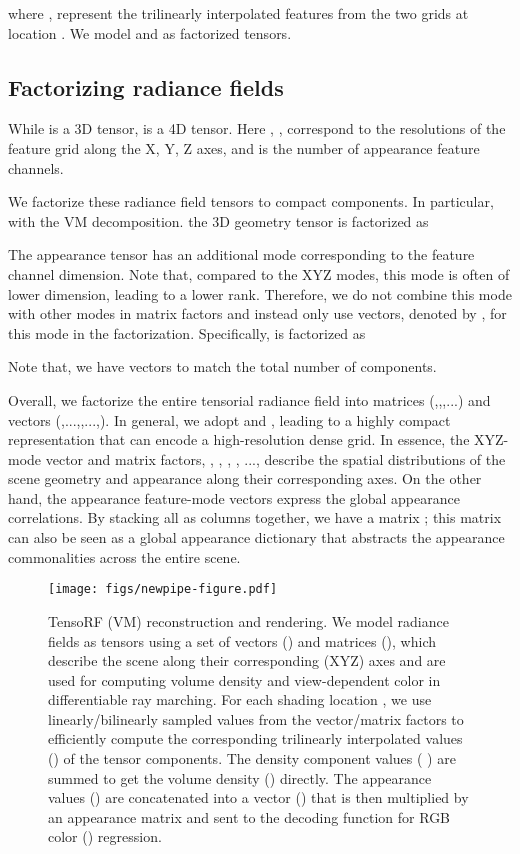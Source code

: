 \documentclass[runningheads]{llncs}
\begin{document}
where ,  represent the trilinearly interpolated features from the two grids at location . 
We model  and  as factorized tensors.






\subsection{Factorizing radiance fields}
While  is a 3D tensor,  is a 4D tensor. Here , ,  correspond to the resolutions of the feature grid along the X, Y, Z axes, and  is the number of appearance feature channels. 

We factorize these radiance field tensors to compact components. In particular, with the VM decomposition. the 3D geometry tensor  is factorized as 




The appearance tensor  has an additional mode corresponding to the feature channel dimension. Note that, compared to the XYZ modes, this mode is often of lower dimension, leading to a lower rank. Therefore, we do not combine this mode with other modes in matrix factors and instead only use vectors, denoted by , for this mode in the factorization. 
Specifically,  is factorized as

Note that, we have  vectors  to match the total number of components.


Overall, we factorize the entire tensorial radiance field into  matrices (,,,...) and  vectors (,...,,...,). 
In general, we adopt  and , leading to a highly compact representation that can encode a high-resolution dense grid.
In essence, the XYZ-mode vector and matrix factors, , , , , ..., describe the spatial distributions of the scene geometry and appearance along their corresponding axes. 
On the other hand, the appearance feature-mode vectors  express the global appearance correlations.
By stacking all  as columns together, we have a  matrix ; this matrix  can also be seen as a global appearance dictionary that abstracts the appearance commonalities across the entire scene. 



\begin{figure*}[t]
    \texttt{[image: figs/newpipe-figure.pdf]}
\caption{TensoRF (VM) reconstruction and rendering. We model radiance fields as tensors using a set of vectors () and matrices (), which describe the scene along their corresponding (XYZ) axes and are used for computing volume density  and view-dependent color  in differentiable ray marching.
For each shading location , we use linearly/bilinearly sampled values from the vector/matrix factors to efficiently compute the corresponding trilinearly interpolated values () of the tensor components. The density component values ( ) are summed 
    to get the volume density () directly. 
The appearance values () are concatenated into a vector () that is then multiplied by an appearance matrix  and sent to the decoding function  for RGB color () regression. 
}
    \label{fig:pipeline}\vspace{-5mm}
\end{figure*}
\end{document}
